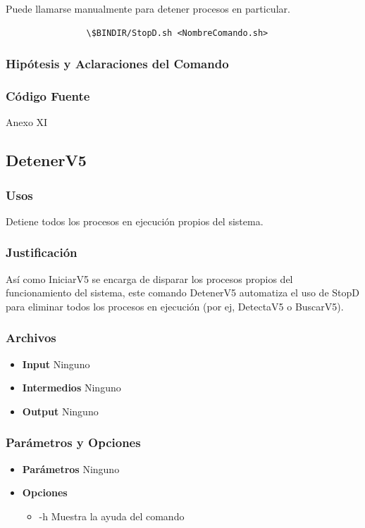 \documentclass[a4paper,10pt,titlepage]{article}
\begin{document}
			 Puede llamarse manualmente para detener procesos en particular.

			\begin{verbatim}
				\$BINDIR/StopD.sh <NombreComando.sh>
			\end{verbatim}

		\subsubsection{Hip\'otesis y Aclaraciones del Comando}

		\subsubsection{C\'odigo Fuente}
			Anexo XI

	\subsection{DetenerV5}
		\subsubsection{Usos}
			Detiene todos los procesos en ejecuci\'on propios del sistema.
		\subsubsection{Justificaci\'on}
			As\'i como IniciarV5 se encarga de disparar los procesos propios del funcionamiento del sistema, este comando DetenerV5 automatiza el uso de StopD para eliminar todos los procesos en ejecuci\'on (por ej, DetectaV5 o BuscarV5). 

		\subsubsection{Archivos}
			\begin {itemize}
				\item \textbf{Input } {Ninguno}
				\item \textbf{Intermedios } {Ninguno}
				\item \textbf{Output } {Ninguno}
			\end{itemize}

		\subsubsection{Par\'ametros y Opciones}
			\begin {itemize}
				\item \textbf{Par\'ametros} { Ninguno }
				\item \textbf{Opciones}{
					\begin{itemize}
						\item {-h }{Muestra la ayuda del comando} 
					\end{itemize}
				}
			\end{itemize}
	
\end{document}
